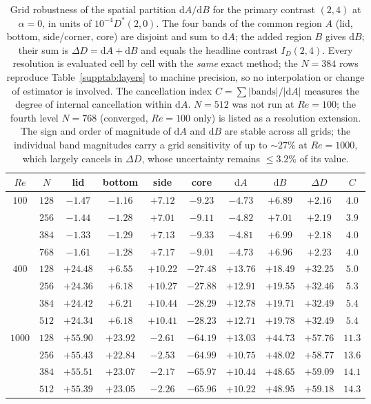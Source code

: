 \begin{table}[!htbp]
\centering
\caption{Grid robustness of the spatial partition $\mathrm{d}A/\mathrm{d}B$ for the primary contrast $(2,4)$ at $\alpha=0$, in units of $10^{-4}D^*(2,0)$. The four bands of the common region $A$ (lid, bottom, side/corner, core) are disjoint and sum to $\mathrm{d}A$; the added region $B$ gives $\mathrm{d}B$; their sum is $\Delta D = \mathrm{d}A + \mathrm{d}B$ and equals the headline contrast $I_D(2,4)$. Every resolution is evaluated cell by cell with the \emph{same} exact method; the $N=384$ rows reproduce Table~\ref{supptab:layers} to machine precision, so no interpolation or change of estimator is involved. The cancellation index $C=\sum|\text{bands}|/|\mathrm{d}A|$ measures the degree of internal cancellation within $\mathrm{d}A$. $N=512$ was not run at $Re=100$; the fourth level $N=768$ (converged, $Re=100$ only) is listed as a resolution extension. The sign and order of magnitude of $\mathrm{d}A$ and $\mathrm{d}B$ are stable across all grids; the individual band magnitudes carry a grid sensitivity of up to $\sim 27\%$ at $Re=1000$, which largely cancels in $\Delta D$, whose uncertainty remains $\leq3.2\%$ of its value.}
\label{supptab:dadb_multires}
\footnotesize
\begin{tabular}{@{}cc|cccc|cccc@{}}
\hline
$Re$ & $N$ & lid & bottom & side & core & $\mathrm{d}A$ & $\mathrm{d}B$ & $\Delta D$ & $C$ \\
\hline
$100$  & $128$ & $-1.47$ & $-1.16$ & $+7.12$ & $-9.23$ & $-4.73$  & $+6.89$  & $+2.16$  & $4.0$ \\
       & $256$ & $-1.44$ & $-1.28$ & $+7.01$ & $-9.11$ & $-4.82$ & $+7.01$ & $+2.19$ & $3.9$ \\
       & $384$ & $-1.33$ & $-1.29$ & $+7.13$ & $-9.33$ & $-4.81$ & $+6.99$ & $+2.18$ & $4.0$ \\
       & $768$ & $-1.61$ & $-1.28$ & $+7.17$ & $-9.01$ & $-4.73$ & $+6.96$ & $+2.23$ & $4.0$ \\
\hline
$400$  & $128$ & $+24.48$ & $+6.55$ & $+10.22$ & $-27.48$ & $+13.76$ & $+18.49$ & $+32.25$ & $5.0$ \\
       & $256$ & $+24.36$ & $+6.18$ & $+10.27$ & $-27.88$ & $+12.91$ & $+19.55$ & $+32.46$ & $5.3$ \\
       & $384$ & $+24.42$ & $+6.21$ & $+10.44$ & $-28.29$ & $+12.78$ & $+19.71$ & $+32.49$ & $5.4$ \\
       & $512$ & $+24.34$ & $+6.18$ & $+10.41$ & $-28.23$ & $+12.71$ & $+19.78$ & $+32.49$ & $5.4$ \\
\hline
$1000$ & $128$ & $+55.90$ & $+23.92$ & $-2.61$ & $-64.19$ & $+13.03$ & $+44.73$ & $+57.76$ & $11.3$ \\
       & $256$ & $+55.43$ & $+22.84$ & $-2.53$ & $-64.99$ & $+10.75$ & $+48.02$ & $+58.77$ & $13.6$ \\
       & $384$ & $+55.51$ & $+23.07$ & $-2.17$ & $-65.97$ & $+10.44$ & $+48.65$ & $+59.09$ & $14.1$ \\
       & $512$ & $+55.39$ & $+23.05$ & $-2.26$ & $-65.96$ & $+10.22$ & $+48.95$ & $+59.18$ & $14.3$ \\
\hline
\end{tabular}
\end{table}

